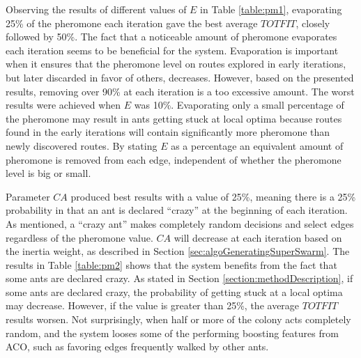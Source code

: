 

Observing the results of different values of $E$ in Table \vref{table:pm1}, evaporating 25\% of the pheromone each iteration gave the best average $TOTFIT$, closely followed by 50\%. The fact that a noticeable amount of pheromone evaporates each iteration seems to be beneficial for the system. Evaporation is important when it ensures that the pheromone level on routes explored in early iterations, but later discarded in favor of others, decreases. However, based on the presented results, removing over 90\% at each iteration is a too excessive amount. The worst results were achieved when $E$ was 10\%. Evaporating only a small percentage of the pheromone may result in ants getting stuck at local optima because routes found in the early iterations will contain significantly more pheromone than newly discovered routes. By stating $E$ as a percentage an equivalent amount of pheromone is removed from each edge, independent of whether the pheromone level is big or small. 

Parameter $CA$ produced best results with a value of 25\%, meaning there is a 25\% probability in that an ant is declared ``crazy'' at the beginning of each iteration. As mentioned, a ``crazy ant'' makes completely random decisions and select edges regardless of the pheromone value. $CA$ will decrease at each iteration based on the inertia weight, as described in Section \vref{sec:algoGeneratingSuperSwarm}. The results in Table \vref{table:pm2} shows that the system benefits from the fact that some ants are declared crazy. As stated in Section \vref{section:methodDescription}, if some ants are declared crazy, the probability of getting stuck at a local optima may decrease. However, if the value is greater than 25\%, the average $TOTFIT$ results worsen. Not surprisingly, when half or more of the colony acts completely random, and the system looses some of the performing boosting features from ACO, such as favoring edges frequently walked by other ants. 


